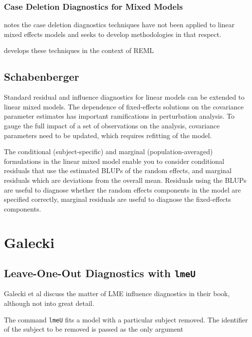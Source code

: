 \documentclass[12pt, a4paper]{report}
\theoremstyle{plain}
\theoremstyle{definition}
\theoremstyle{remark}
\begin{document}
	
	
	\subsection{Case Deletion Diagnostics for Mixed Models}
	
	\citet{Christiansen} notes the case deletion diagnostics techniques have not been applied to linear mixed effects models and seeks to develop methodologies in that respect.
	
	\citet{Christiansen} develops these techniques in the context of REML
	
	
	
	
	




	\section{Schabenberger}     %
	
	Standard residual and influence diagnostics for linear models can
	be extended to linear mixed models. The dependence of
	fixed-effects solutions on the covariance parameter estimates has
	important ramifications in perturbation analysis. To gauge the
	full impact of a set of observations on the analysis, covariance
	parameters need to be updated, which requires refitting of the
	model.
	
	The conditional (subject-specific) and marginal
	(population-averaged) formulations in the linear mixed model
	enable you to consider conditional residuals that use the
	estimated BLUPs of the random effects, and marginal residuals
	which are deviations from the overall mean. Residuals using the
	BLUPs are useful to diagnose whether the random effects components
	in the model are specified correctly, marginal residuals are
	useful to diagnose the fixed-effects components.
\chapter{Galecki}
\section*{Leave-One-Out Diagnostics with \texttt{lmeU}}
Galecki et al discuss the matter of LME influence diagnostics in their book, although not into great detail.


The command \texttt{lmeU} fits a model with a particular subject removed. The identifier of the subject to be removed is passed as the only argument
\end{document}
